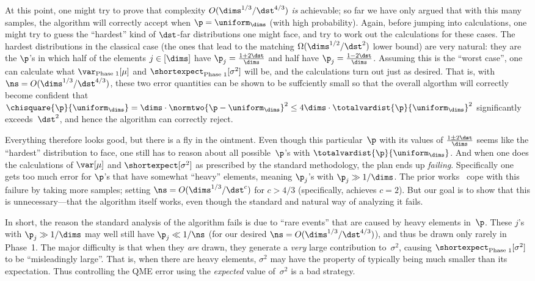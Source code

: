 \documentclass[11pt]{article}
\newcommand{\E}{\shortexpect}
\begin{document}
At this point, one might try to prove that complexity $O(\dims^{1/3}/\dst^{4/3})$ \emph{is} achievable; so far we have only argued that with this many samples, the algorithm will correctly accept when $\p = \uniform_\dims$ (with high probability).
Again, before jumping into calculations, one might try to guess the ``hardest'' kind of $\dst$-far distributions one might face, and try to work out the calculations for these cases.
The hardest distributions in the classical case (\ie the ones that lead to the matching $\Omega(\dims^{1/2}/\dst^2)$ lower bound) are very natural: they are the $\p$'s in which half of the elements $j \in [\dims]$ have $\p_j = \frac{1+2\dst}{\dims}$ and half have $\p_j = \frac{1-2\dst}{\dims}$.  
Assuming this is the ``worst case'', one can calculate what $\var_{\text{Phase~1}}[\mu]$ and $\E_{\text{Phase~1}}[\sigma^2]$ will be, and the calculations turn out just as desired.  
That is, with $\ns = O(\dims^{1/3}/\dst^{4/3})$, these two error quantities can be shown to be suffciently small so that the overall algorthm will correctly become confident that $\chisquare{\p}{\uniform_\dims} = \dims \cdot \normtwo{\p - \uniform_\dims}^2  \leq 4\dims \cdot \totalvardist{\p}{\uniform_\dims}^2$ significantly exceeds~$\dst^2$, and hence the algorithm can correctly reject. 

Everything therefore looks good, but there is a fly in the ointment.  
Even though this particular~$\p$ with its values of $\frac{1 \pm 2\dst}{\dims}$ seems like the ``hardest'' distribution to face, one still has to reason about all possible~$\p$'s with $\totalvardist{\p}{\uniform_\dims}$.
And when one does the calculations of $\var[\mu]$ and $\E[\sigma^2]$ as prescribed by the standard methodology, the plan ends up \emph{failing}.
Specifically one gets too much error for $\p$'s that have somewhat ``heavy'' elements, meaning $\p_j$'s with $\p_j \gg 1/\dims$.   The prior works~\cite{BHH11,CFMdW10} cope with this failure by taking more samples; \ie setting $\ns = O(\dims^{1/3}/\dst^{c})$ for $c > 4/3$ (specifically, \cite{CFMdW10} achieves $c=2$).  But our goal is to show that this is unnecessary---that the algorithm itself works, even though the standard and natural way of analyzing it fails. 

In short, the reason the standard analysis of the algorithm fails is due to ``rare events'' that are caused by heavy elements in~$\p$. 
These $j$'s with $\p_j \gg 1/\dims$ may well still have $\p_j \ll 1/\ns$ (for our desired $\ns = O(\dims^{1/3}/\dst^{4/3})$), and thus be drawn only rarely in Phase~1.  
The major difficulty is that when they \emph{are} drawn, they generate a \emph{very} large contribution to~$\sigma^2$, causing $\E_{\text{Phase~1}}[\sigma^2]$ to be ``misleadingly large''.  
That is, when there are heavy elements, $\sigma^2$ may have the property of typically being much smaller than its expectation.
Thus controlling the QME error using the \emph{expected} value of~$\sigma^2$ is a bad strategy. 
\end{document}

